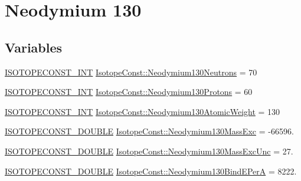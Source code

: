 \hypertarget{group___isotope_const-_neodymium-_nd130}{}\section{Neodymium 130}
\label{group___isotope_const-_neodymium-_nd130}
\subsection*{Variables}
\begin{DoxyCompactItemize}
\item 
\mbox{\hyperlink{group___isotope_const-_macros_ga5f18360b3e99483a35c32d789e62621c}{I\+S\+O\+T\+O\+P\+E\+C\+O\+N\+S\+T\+\_\+\+I\+NT}} \mbox{\hyperlink{group___isotope_const-_neodymium-_nd130_ga0e6e7976c411976a8821183b4f2d5912}{Isotope\+Const\+::\+Neodymium130\+Neutrons}} = 70
\item 
\mbox{\hyperlink{group___isotope_const-_macros_ga5f18360b3e99483a35c32d789e62621c}{I\+S\+O\+T\+O\+P\+E\+C\+O\+N\+S\+T\+\_\+\+I\+NT}} \mbox{\hyperlink{group___isotope_const-_neodymium-_nd130_gabfd553c6628d89c6bb9f44a4ee5091ab}{Isotope\+Const\+::\+Neodymium130\+Protons}} = 60
\item 
\mbox{\hyperlink{group___isotope_const-_macros_ga5f18360b3e99483a35c32d789e62621c}{I\+S\+O\+T\+O\+P\+E\+C\+O\+N\+S\+T\+\_\+\+I\+NT}} \mbox{\hyperlink{group___isotope_const-_neodymium-_nd130_gaedb7d773bf4fd37642873ab1cad35094}{Isotope\+Const\+::\+Neodymium130\+Atomic\+Weight}} = 130
\item 
\mbox{\hyperlink{group___isotope_const-_macros_ga8f45a7272ce02c0b4c65c44636ed719a}{I\+S\+O\+T\+O\+P\+E\+C\+O\+N\+S\+T\+\_\+\+D\+O\+U\+B\+LE}} \mbox{\hyperlink{group___isotope_const-_neodymium-_nd130_ga42d29f62d4b121d96f0f4c584520956d}{Isotope\+Const\+::\+Neodymium130\+Mass\+Exc}} = -\/66596.
\item 
\mbox{\hyperlink{group___isotope_const-_macros_ga8f45a7272ce02c0b4c65c44636ed719a}{I\+S\+O\+T\+O\+P\+E\+C\+O\+N\+S\+T\+\_\+\+D\+O\+U\+B\+LE}} \mbox{\hyperlink{group___isotope_const-_neodymium-_nd130_gaf53b8215875e97f53373fc75bc89ac3c}{Isotope\+Const\+::\+Neodymium130\+Mass\+Exc\+Unc}} = 27.
\item 
\mbox{\hyperlink{group___isotope_const-_macros_ga8f45a7272ce02c0b4c65c44636ed719a}{I\+S\+O\+T\+O\+P\+E\+C\+O\+N\+S\+T\+\_\+\+D\+O\+U\+B\+LE}} \mbox{\hyperlink{group___isotope_const-_neodymium-_nd130_ga2083db4ec29a7eb86f47dfdb376bf30b}{Isotope\+Const\+::\+Neodymium130\+Bind\+E\+PerA}} = 8222.
\item 

\end{DoxyCompactItemize}
